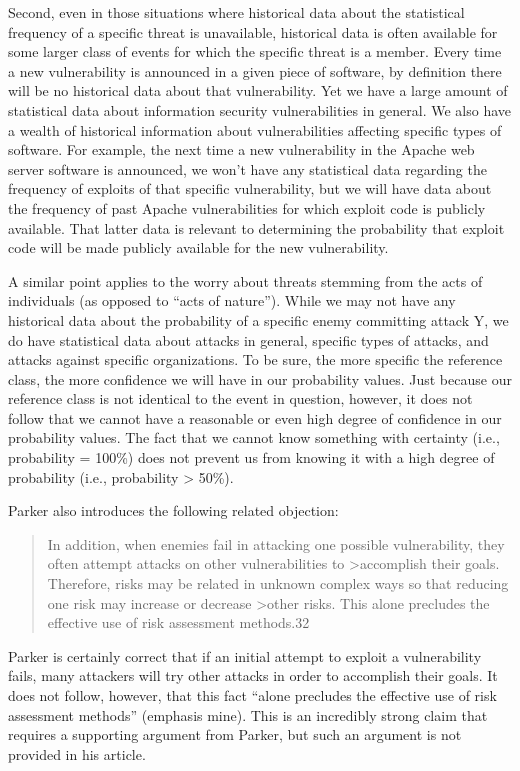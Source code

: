 Second, even in those situations where historical data about the
statistical frequency of a specific threat is unavailable, historical
data is often available for some larger class of events for which the
specific threat is a member. Every time a new vulnerability is announced
in a given piece of software, by definition there will be no historical
data about that vulnerability. Yet we have a large amount of statistical
data about information security vulnerabilities in general. We also have
a wealth of historical information about vulnerabilities affecting
specific types of software. For example, the next time a new
vulnerability in the Apache web server software is announced, we won't
have any statistical data regarding the frequency of exploits of that
specific vulnerability, but we will have data about the frequency of
past Apache vulnerabilities for which exploit code is publicly
available. That latter data is relevant to determining the probability
that exploit code will be made publicly available for the new
vulnerability.

A similar point applies to the worry about threats stemming from the
acts of individuals (as opposed to ``acts of nature''). While we may not
have any historical data about the probability of a specific enemy
committing attack Y, we do have statistical data about attacks in
general, specific types of attacks, and attacks against specific
organizations. To be sure, the more specific the reference class, the
more confidence we will have in our probability values. Just because our
reference class is not identical to the event in question, however, it
does not follow that we cannot have a reasonable or even high degree of
confidence in our probability values. The fact that we cannot know
something with certainty (i.e., probability = 100\%) does not prevent us
from knowing it with a high degree of probability (i.e., probability
\textgreater{} 50\%).

Parker also introduces the following related objection:

\begin{quote}
In addition, when enemies fail in attacking one possible vulnerability,
they often attempt attacks on other vulnerabilities to
\textgreater{}accomplish their goals. Therefore, risks may be related in
unknown complex ways so that reducing one risk may increase or decrease
\textgreater{}other risks. This alone precludes the effective use of
risk assessment methods.32
\end{quote}

Parker is certainly correct that if an initial attempt to exploit a
vulnerability fails, many attackers will try other attacks in order to
accomplish their goals. It does not follow, however, that this fact
``alone precludes the effective use of risk assessment methods''
(emphasis mine). This is an incredibly strong claim that requires a
supporting argument from Parker, but such an argument is not provided in
his article.

